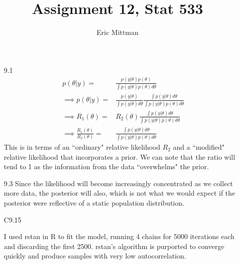 \documentclass{scrartcl}\usepackage[]{graphicx}\usepackage[]{color}
\author{Eric Mittman}
\title{Assignment 12, Stat 533}
\begin{document}
\maketitle
\begin{enumerate}
\item[9.1]
\begin{align}
p(\theta|y) =& \frac{p(y|\theta)p(\theta)}{\int p(y|\theta) p(\theta) d\theta}\\
\implies p(\theta|y) =& \frac{p(y|\theta)}{\int p(y|\theta) d\theta} \frac{\int p(y|\theta)d\theta}{\int p(y|\theta) p(\theta)d\theta}\\
\implies R_1(\theta) =& R_2(\theta)\frac{\int p(y|\theta)d\theta}{\int p(y|\theta) p(\theta)d\theta}\\
\implies \frac{R_1(\theta)}{R_2(\theta)} =& \frac{\int p(y|\theta)d\theta}{\int p(y|\theta) p(\theta)d\theta}
\end{align}
This is in terms of an ``ordinary" relative likelihood $R_2$ and a ``modified" relative likelihood that incorporates a prior. We can note that the ratio will tend to 1 as the information from the data ``overwhelms" the prior.

\item[9.3]
Since the likelihood will become increasingly concentrated as we collect more data, the posterior will also, which is not what we would expect if the posterior were reflective of a static population distribution.

\item[C9.15]

I used rstan in R to fit the model, running 4 chains for 5000 iterations each and discarding the first 2500. rstan's algorithm is purported to converge quickly and produce samples with very low autocorrelation.


\end{enumerate}
\end{document}
